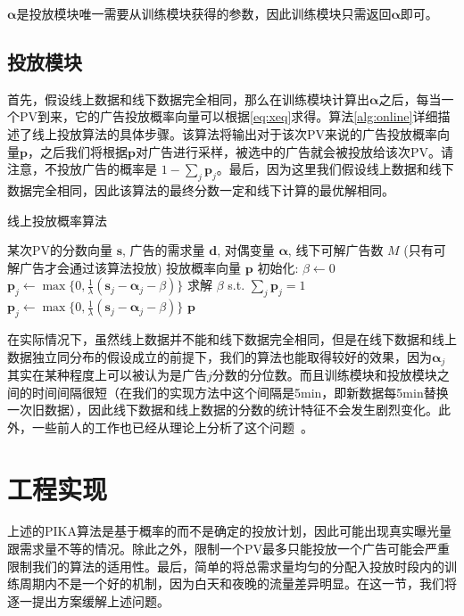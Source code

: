$\bm{\alpha}$是投放模块唯一需要从训练模块获得的参数，因此训练模块只需返回$\bm{\alpha}$即可。

\subsection{投放模块}

首先，假设线上数据和线下数据完全相同，那么在训练模块计算出$\bm{\alpha}$之后，每当一个PV到来，它的广告投放概率向量可以根据\eqref{eq:xeq}求得。算法\ref{alg:online}详细描述了线上投放算法的具体步骤。该算法将输出对于该次PV来说的广告投放概率向量$\bm{p}$，之后我们将根据$\bm{p}$对广告进行采样，被选中的广告就会被投放给该次PV。请注意，不投放广告的概率是 $1-\sum_j \bm{p}_j$。最后，因为这里我们假设线上数据和线下数据完全相同，因此该算法的最终分数一定和线下计算的最优解相同。

\begin{algorithm}[tb]
	\caption{线上投放概率算法} 
	\label{alg:online}
	\begin{algorithmic}[1]
		\REQUIRE 某次PV的分数向量 $\bm{s}$, 广告的需求量 $\bm{d}$, 对偶变量 $\bm{\alpha}$, 线下可解广告数 $M$  (只有可解广告才会通过该算法投放)
		\ENSURE 投放概率向量 $\bm{p}$
		\STATE 初始化: $\beta \leftarrow 0$
		\STATE $\bm{p}_j \leftarrow \max \{0, \frac{1}{\lambda}  (\bm{s}_j - \bm{\alpha}_j - \beta )\}$
		\ENDFOR
		\STATE 求解 $\beta$ s.t. $\sum_j \bm{p}_j = 1$
		\STATE $\bm{p}_j \leftarrow \max \{0, \frac{1}{\lambda}  (\bm{s}_j - \bm{\alpha}_j - \beta )\}$
		\ENDFOR
		\ENDIF
		\RETURN $\bm{p}$
	\end{algorithmic}
\end{algorithm}

在实际情况下，虽然线上数据并不能和线下数据完全相同，但是在线下数据和线上数据独立同分布的假设成立的前提下，我们的算法也能取得较好的效果，因为$\bm{\alpha}_j$其实在某种程度上可以被认为是广告$j$分数的分位数。而且训练模块和投放模块之间的时间间隔很短（在我们的实现方法中这个间隔是5min，即新数据每5min替换一次旧数据），因此线下数据和线上数据的分数的统计特征不会发生剧烈变化。此外，一些前人的工作也已经从理论上分析了这个问题~\cite{devanur2009adwords, feldman2010online}。

\section{工程实现}

上述的PIKA算法是基于概率的而不是确定的投放计划，因此可能出现真实曝光量跟需求量不等的情况。除此之外，限制一个PV最多只能投放一个广告可能会严重限制我们的算法的适用性。最后，简单的将总需求量均匀的分配入投放时段内的训练周期内不是一个好的机制，因为白天和夜晚的流量差异明显。在这一节，我们将逐一提出方案缓解上述问题。

